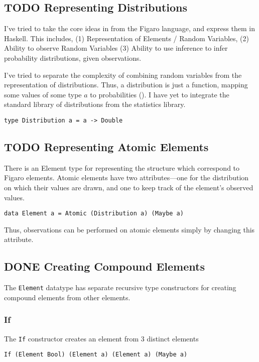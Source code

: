 \documentclass[11pt]{article}
\begin{document}
\subsection{{\bfseries\sffamily TODO} Representing Distributions}
\label{sec-1-4}
I've tried to take the core ideas in from the Figaro language, and express
them in Haskell. This includes, (1) Representation of Elements / Random Variables,
(2) Ability to observe Random Variables (3) Ability to use inference to infer
probability distributions, given observations.

I've tried to separate the complexity of combining random variables from
the representation of distributions. Thus, a distribution is just a function,
mapping some values of some type $a$ to probabilities (). I have yet
to integrate the standard library of distributions from the statistics library.
\begin{center}
\texttt{type Distribution a = a -> Double}
\end{center}

\subsection{{\bfseries\sffamily TODO} Representing Atomic Elements}
\label{sec-1-5}
There is an Element type for representing the structure which correspond
to Figaro elements. Atomic elements have two attributes---one for the distribution
on which their values are drawn, and one to keep track of the element's observed
values.

\begin{center}
\texttt{data Element a = Atomic (Distribution a) (Maybe a)}
\end{center}

Thus, observations can be performed on atomic elements simply by
changing this attribute.

\subsection{{\bfseries\sffamily DONE} Creating Compound Elements}
\label{sec-1-6}
The \texttt{Element} datatype has separate recursive type constructors for creating
 compound elements from other elements.
\subsubsection{If}
\label{sec-1-6-1}
The \texttt{If} constructor creates an element from 3 distinct elements
\begin{center}
\texttt{If (Element Bool) (Element a) (Element a) (Maybe a)}
\end{center}
\end{document}
